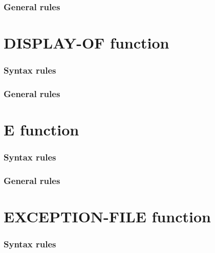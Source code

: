 \subsubsection{General rules}

\section{DISPLAY-OF function}

\begin{syntax}
\end{syntax}

\subsubsection{Syntax rules}

\subsubsection{General rules}

\section{E function}

\begin{syntax}
   
\end{syntax}

\subsubsection{Syntax rules}

\subsubsection{General rules}

\section{EXCEPTION-FILE function}

\begin{syntax}
   
\end{syntax}

\subsubsection{Syntax rules}

